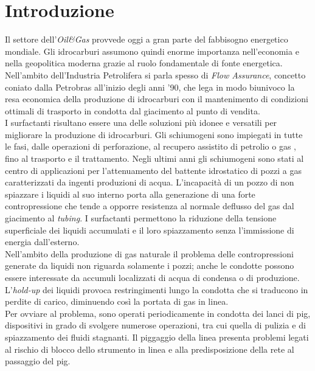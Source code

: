\clearpage{\pagestyle{empty}\cleardoublepage}
\chapter*{Introduzione}\thispagestyle{empty} 
Il settore dell'\textit{Oil\&{Gas}} provvede oggi a gran parte del fabbisogno energetico mondiale. Gli idrocarburi assumono quindi enorme importanza nell'economia e nella geopolitica moderna grazie al ruolo fondamentale di fonte energetica. Nell'ambito dell'Industria Petrolifera si parla spesso di \textit{Flow Assurance}, concetto coniato dalla Petrobras all'inizio degli anni '90, che lega in modo biunivoco la resa economica della produzione di idrocarburi con il mantenimento di condizioni ottimali di trasporto in condotta dal giacimento al punto di vendita.\\
I surfactanti risultano essere una delle soluzioni più idonee e versatili per migliorare la produzione di idrocarburi. Gli schiumogeni sono impiegati in tutte le fasi, dalle operazioni di perforazione, al recupero assistito di petrolio o gas , fino al trasporto e il trattamento. Negli ultimi anni gli schiumogeni sono stati al centro di applicazioni per l'attenuamento del battente idrostatico di pozzi a gas caratterizzati da ingenti produzioni di acqua. L'incapacità di un pozzo di non spiazzare i liquidi al suo interno porta alla generazione di una forte contropressione che tende a opporre resistenza al normale deflusso del gas dal giacimento al \textit{tubing}. I surfactanti permettono la riduzione della tensione superficiale dei liquidi accumulati e il loro spiazzamento senza l'immissione di energia dall'esterno.\\
Nell'ambito della produzione di gas naturale il problema delle contropressioni generate da liquidi non riguarda solamente i pozzi; anche le condotte possono essere interessate da accumuli localizzati di acqua di condensa o di produzione. L'\textit{hold-up} dei liquidi provoca restringimenti lungo la condotta che si traducono in perdite di carico, diminuendo così la portata di gas in linea.\\
Per ovviare al problema, sono operati periodicamente in condotta dei lanci di pig, dispositivi in grado di svolgere numerose operazioni, tra cui quella di pulizia e di spiazzamento dei fluidi stagnanti. Il piggaggio della linea presenta problemi legati al rischio di blocco dello strumento in linea e alla predisposizione della rete al passaggio del pig.\\
